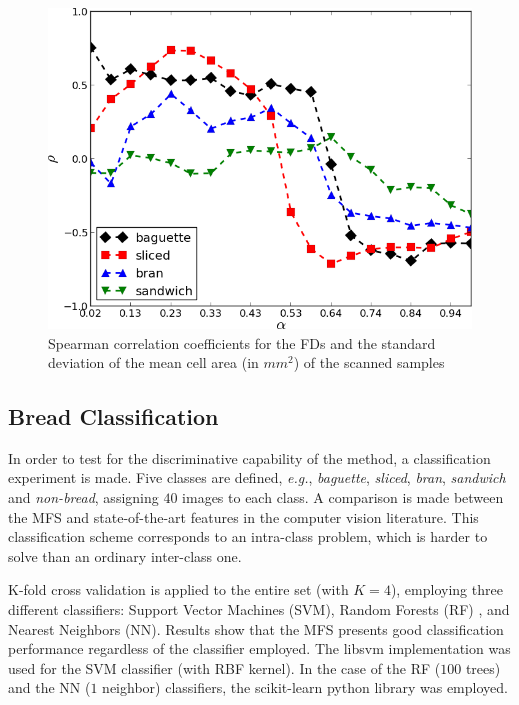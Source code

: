 \begin{figure}[htb]
\centering
\includegraphics[scale=0.42]{../images/Fig9}
\caption{Spearman correlation coefficients for the FDs and the standard deviation of the mean cell area (in $mm^{2}$) of the scanned samples}
\label{fig:corrMCAstdev}
\end{figure}

\subsection{Bread Classification}
\label{sec:10}

In order to test for the discriminative capability of the method, a classification experiment is made. Five classes are defined, {\em e.g.}, {\em baguette}, {\em sliced}, {\em bran}, {\em sandwich} and {\em non-bread}, assigning $40$ images to each class. A comparison is made between the MFS and state-of-the-art features in the computer vision literature. This classification scheme corresponds to an intra-class problem, which is harder to solve than an ordinary inter-class one. 

K-fold cross validation is applied to the entire set (with $K=4$), employing three different classifiers: Support Vector Machines (SVM), Random Forests (RF) \cite{Breiman2001}, and Nearest Neighbors (NN). Results show that the MFS presents good classification performance regardless of the classifier employed. The \textsf{libsvm} implementation \cite{Chang2011} was used for the SVM classifier (with RBF kernel). In the case of the RF ($100$ trees) and the NN ($1$ neighbor) classifiers, the \textsf{scikit-learn} python library was employed.

